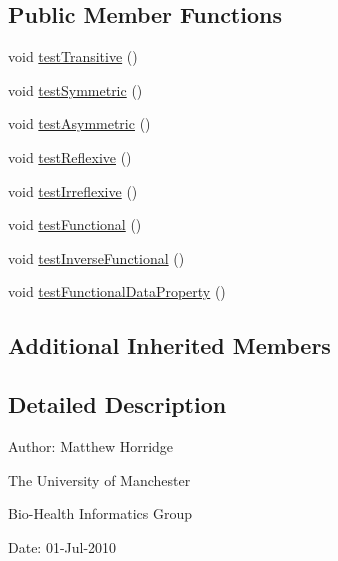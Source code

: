 \subsection*{Public Member Functions}
\begin{DoxyCompactItemize}
\item 
void \hyperlink{classorg_1_1semanticweb_1_1owlapi_1_1api_1_1test_1_1_property_characteristics_accessors_test_case_afc1935c85d448d06861118735d05e6e2}{test\-Transitive} ()
\item 
void \hyperlink{classorg_1_1semanticweb_1_1owlapi_1_1api_1_1test_1_1_property_characteristics_accessors_test_case_a8e7038ee1c56ceefe42817cb0f6a0e47}{test\-Symmetric} ()
\item 
void \hyperlink{classorg_1_1semanticweb_1_1owlapi_1_1api_1_1test_1_1_property_characteristics_accessors_test_case_aa4cc29f95e0ab6a087291ccfd297da14}{test\-Asymmetric} ()
\item 
void \hyperlink{classorg_1_1semanticweb_1_1owlapi_1_1api_1_1test_1_1_property_characteristics_accessors_test_case_a68aa7d5951d1c122eec48e44a9c0e2af}{test\-Reflexive} ()
\item 
void \hyperlink{classorg_1_1semanticweb_1_1owlapi_1_1api_1_1test_1_1_property_characteristics_accessors_test_case_a429e0f6337e747b1df1f59e3a2145718}{test\-Irreflexive} ()
\item 
void \hyperlink{classorg_1_1semanticweb_1_1owlapi_1_1api_1_1test_1_1_property_characteristics_accessors_test_case_ac2e96284709e49b1818f90d9d712103d}{test\-Functional} ()
\item 
void \hyperlink{classorg_1_1semanticweb_1_1owlapi_1_1api_1_1test_1_1_property_characteristics_accessors_test_case_aab96d4e0f407a0da20e774c284e937db}{test\-Inverse\-Functional} ()
\item 
void \hyperlink{classorg_1_1semanticweb_1_1owlapi_1_1api_1_1test_1_1_property_characteristics_accessors_test_case_acff8f60864a5f31ed234678aeaf72a65}{test\-Functional\-Data\-Property} ()
\end{DoxyCompactItemize}
\subsection*{Additional Inherited Members}


\subsection{Detailed Description}
Author\-: Matthew Horridge\par
 The University of Manchester\par
 Bio-\/\-Health Informatics Group\par
 Date\-: 01-\/\-Jul-\/2010 

